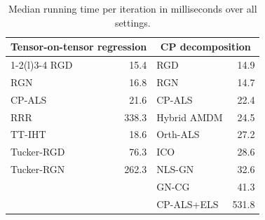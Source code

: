 \begin{table}[!htbp]
\centering
\caption{Median running time per iteration in milliseconds over all settings.}
\label{tab:timing}
{\small
\begin{tabular}{lr@{\qquad}lr}
\toprule
\multicolumn{2}{c}{Tensor-on-tensor regression} & \multicolumn{2}{c}{CP decomposition}\\
\cmidrule(r){1-2}\cmidrule(l){3-4}
RGD & 15.4 & RGD & 14.9 \\
RGN & 16.8 & RGN & 14.7 \\
CP-ALS & 21.6 & CP-ALS & 22.4 \\
RRR & 338.3 & Hybrid AMDM & 24.5 \\
TT-IHT & 18.6 & Orth-ALS & 27.2 \\
Tucker-RGD & 76.3 & ICO & 28.6 \\
Tucker-RGN & 262.3 & NLS-GN & 32.6 \\
 &  & GN-CG & 41.3 \\
 &  & CP-ALS+ELS & 531.8 \\
\bottomrule
\end{tabular}}
\end{table}
